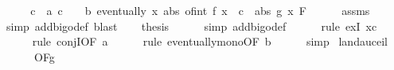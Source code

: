 \begin{isabellebody}
%
\isadelimproof
%
\endisadelimproof
%
\isatagproof
{}\isamarkupfalse%
\ {\isacharminus}{\kern0pt}\isanewline
\ \ \isamarkupfalse%
\ c\ \ a{\isacharcolon}{\kern0pt}\ {\isachardoublequoteopen}c\ {\isachargreater}{\kern0pt}\ {}{\isachardoublequoteclose}\ \ b{\isacharcolon}{\kern0pt}\ {\isachardoublequoteopen}eventually\ {\isacharparenleft}{\kern0pt}{\isasymlambda}x{\isachardot}{\kern0pt}\ abs\ {\isacharparenleft}{\kern0pt}of{\isacharunderscore}{\kern0pt}int\ {\isacharparenleft}{\kern0pt}f\ x{\isacharparenright}{\kern0pt}{\isacharparenright}{\kern0pt}\ {\isasymle}\ c\ {\isacharasterisk}{\kern0pt}\ abs\ {\isacharparenleft}{\kern0pt}g\ x{\isacharparenright}{\kern0pt}{\isacharparenright}{\kern0pt}\ F{\isacharprime}{\kern0pt}{\isachardoublequoteclose}\isanewline
\ \ \ \ \isamarkupfalse%
\ assms{\isacharparenleft}{\kern0pt}{}{\isacharparenright}{\kern0pt}\ \isamarkupfalse%
\ {\isacharparenleft}{\kern0pt}simp\ add{\isacharcolon}{\kern0pt}bigo{\isacharunderscore}{\kern0pt}def{\isacharcomma}{\kern0pt}\ blast{\isacharparenright}{\kern0pt}\isanewline
\isanewline
\ \ \isamarkupfalse%
\ {\isacharquery}{\kern0pt}thesis\isanewline
\ \ \ \ \isamarkupfalse%
\ {\isacharparenleft}{\kern0pt}simp\ add{\isacharcolon}{\kern0pt}bigo{\isacharunderscore}{\kern0pt}def{\isacharparenright}{\kern0pt}\isanewline
\ \ \ \ \isamarkupfalse%
\ {\isacharparenleft}{\kern0pt}rule\ exI{\isacharbrackleft}{\kern0pt}\ x{\isacharequal}{\kern0pt}{\isachardoublequoteopen}c{\isachardoublequoteclose}{\isacharbrackright}{\kern0pt}{\isacharparenright}{\kern0pt}\isanewline
\ \ \ \ \isamarkupfalse%
\ {\isacharparenleft}{\kern0pt}rule\ conjI{\isacharbrackleft}{\kern0pt}OF\ a{\isacharbrackright}{\kern0pt}{\isacharparenright}{\kern0pt}\isanewline
\ \ \ \ \isamarkupfalse%
\ {\isacharparenleft}{\kern0pt}rule\ eventually{\isacharunderscore}{\kern0pt}mono{\isacharbrackleft}{\kern0pt}OF\ b{\isacharbrackright}{\kern0pt}{\isacharparenright}{\kern0pt}\isanewline
\ \ \ \ \isamarkupfalse%
\ simp\isanewline
{}\isamarkupfalse%
%
\endisatagproof
{\isafoldproof}%
%
\isadelimproof
\isanewline
%
\endisadelimproof
\isanewline
{}\isamarkupfalse%
\ landau{\isacharunderscore}{\kern0pt}ceil{\isacharcolon}{\kern0pt}\isanewline
\ \ \ {\isachardoublequoteopen}{\isacharparenleft}{\kern0pt}{\isasymlambda}{\isacharunderscore}{\kern0pt}{\isachardot}{\kern0pt}\ {}{\isacharparenright}{\kern0pt}\ {\isasymin}\ O{\isacharbrackleft}{\kern0pt}F{\isacharprime}{\kern0pt}{\isacharbrackright}{\kern0pt}{\isacharparenleft}{\kern0pt}g{\isacharparenright}{\kern0pt}{\isachardoublequoteclose}\isanewline

\end{isabellebody}
